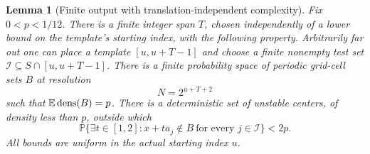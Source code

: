 \documentclass[11pt]{article}
\newtheorem{lemma}[theorem]{Lemma}
\theoremstyle{remark}\newtheorem{remark}[theorem]{Remark}
\newcommand{\Prob}{\mathbb P}\newcommand{\dens}{\operatorname{dens}}
\begin{document}
\begin{lemma}[Finite output with translation-independent complexity]\label{lem:engine}
Fix $0<p<1/12$. There is a finite integer span $T$, chosen independently of a lower bound on the template's starting index, with the following property. Arbitrarily far out one can place a template $[u,u+T-1]$ and choose a finite nonempty test set $\mathcal I\subseteq S\cap[u,u+T-1]$. There is a finite probability space of periodic grid-cell sets $B$ at resolution
\begin{equation}\label{eq:resolution}
 N=2^{u+T+2}
\end{equation}
such that $\E\dens(B)=p$. There is a deterministic set of unstable centers, of density less than $p$, outside which
\begin{equation}\label{eq:failure}
 \Prob\{\exists t\in[1,2]:x+ta_j\notin B\ \text{for every }j\in\mathcal I\}<2p.
\end{equation}
All bounds are uniform in the actual starting index $u$.
\end{lemma}
\end{document}
